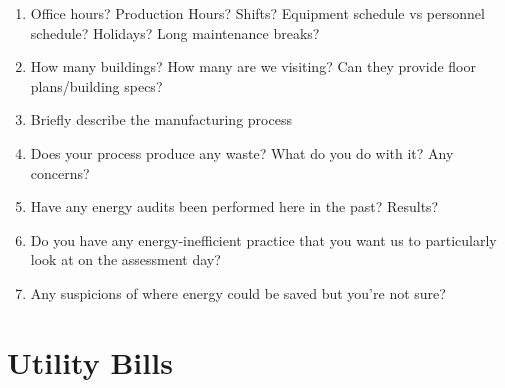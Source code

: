 \documentclass[./main.tex]{subfiles}
\begin{document}
\begin{enumerate}[leftmargin=*]
\item Office hours? Production Hours? Shifts? Equipment schedule vs personnel schedule? Holidays? Long maintenance breaks?

\vspace{\answerspace}

\item How many buildings? How many are we visiting? Can they provide floor plans/building specs?

\vspace{\answerspace}

\item Briefly describe the manufacturing process

\vspace{\answerspace} \vspace{\answerspace} \vspace{\answerspace} 

\item Does your process produce any waste? What do you do with it? Any concerns?

\vspace{\answerspace}

\item Have any energy audits been performed here in the past? Results?

\vspace{\answerspace}

\item Do you have any energy-inefficient practice that you want us to particularly look at on the assessment day?

\vspace{\answerspace}

\item Any suspicions of where energy could be saved but you're not sure?

\vspace{\answerspace}


\end{enumerate}

\section*{Utility Bills}
\end{document}
